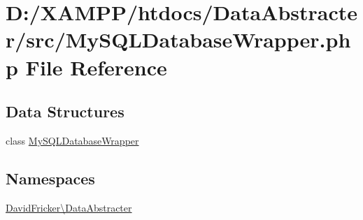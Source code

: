 \hypertarget{_my_s_q_l_database_wrapper_8php}{}\section{D\+:/\+X\+A\+M\+P\+P/htdocs/\+Data\+Abstracter/src/\+My\+S\+Q\+L\+Database\+Wrapper.php File Reference}
\label{_my_s_q_l_database_wrapper_8php}
\subsection*{Data Structures}
\begin{DoxyCompactItemize}
\item 
class \hyperlink{class_david_fricker_1_1_data_abstracter_1_1_my_s_q_l_database_wrapper}{My\+S\+Q\+L\+Database\+Wrapper}
\end{DoxyCompactItemize}
\subsection*{Namespaces}
\begin{DoxyCompactItemize}
\item 
 \hyperlink{namespace_david_fricker_1_1_data_abstracter}{David\+Fricker\textbackslash{}\+Data\+Abstracter}
\end{DoxyCompactItemize}
